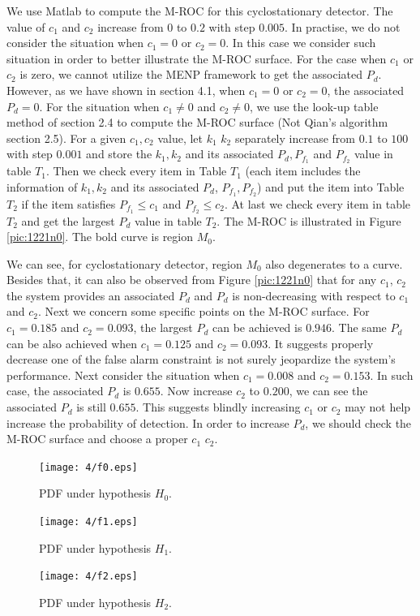 We use Matlab to compute the M-ROC for this cyclostationary detector. The value of $c_1$ and $c_2$ increase from $0$ to $0.2$ with step $0.005$. In practise, we do not consider the situation when $c_1 = 0$ or $c_2 = 0$.  In this case we consider such situation in order to better illustrate the M-ROC surface. For the case when $c_1$ or $c_2$ is zero, we cannot utilize the MENP framework to get the associated $P_d$.  However, as we have shown in section 4.1, when $c_1 = 0$ or $c_2 = 0$, the associated $P_d=0$.   For the situation when $c_1 \neq 0$ and $c_2 \neq 0$, we use the look-up table method of section 2.4 to compute the M-ROC surface (Not Qian's algorithm section 2.5).  For a given $c_1, c_2$ value, let $k_1$ $k_2$ separately increase from $0.1$ to $100$ with step $0.001$ and store the $k_1, k_2$ and its associated $P_d, P_{f_1}$ and $P_{f_2}$ value in table $T_1$. 
Then we check every item in Table $T_1$ (each item includes the information of $k_1, k_2$ and its associated $P_d$, $P_{f_1}, P_{f_2}$) and put the item into Table $T_2$ if the item satisfies $P_{f_1} \leq c_1$ and $P_{f_2} \leq c_2$. At last we check every item in table $T_2$ and get the largest $P_d$ value in table $T_2$.  
The M-ROC is illustrated in Figure \ref{pic:1221n0}. The bold curve is region $M_0$. 

We can see, for cyclostationary detector, region $M_0$ also degenerates to a curve. Besides that, it can also be observed from Figure \ref{pic:1221n0} that for any $c_1$, $c_2$ the system provides an associated $P_d$ and $P_d$ is non-decreasing with respect to $c_1$ and $c_2$.
Next we concern some specific points on the M-ROC surface.  
For $c_1 = 0.185$ and $c_2  = 0.093$, the largest $P_d$ can be achieved is $0.946$. The same $P_d$ can be also achieved when $c_1 = 0.125$ and $c_2 = 0.093$. It suggests properly decrease one of the false alarm constraint is not surely jeopardize the system's performance.  
Next consider the situation when $c_1 = 0.008$ and $c_2 = 0.153$. In such case, the associated $P_d$ is $0.655$. Now increase $c_2$ to $0.200$, we can see the associated $P_d$ is still $0.655$.  This suggests blindly increasing $c_1$ or $c_2$ may not help increase the probability of detection.
In order to increase $P_d$, we should check the M-ROC surface and choose a proper $c_1$ $c_2$.

\begin{figure}[!t]
  \centering 
  \texttt{[image: 4/f0.eps]}
  \caption{PDF under hypothesis $H_0$.}
  \label{pic:1218n0}
\end{figure}
\begin{figure}[!t]
  \centering 
  \texttt{[image: 4/f1.eps]}
  \caption{PDF under hypothesis $H_1$.}
  \label{pic:1218n1}
\end{figure}
\begin{figure}[!t]
  \centering 
  \texttt{[image: 4/f2.eps]}
  \caption{PDF under hypothesis $H_2$.}
  \label{pic:1218n2}
\end{figure}

